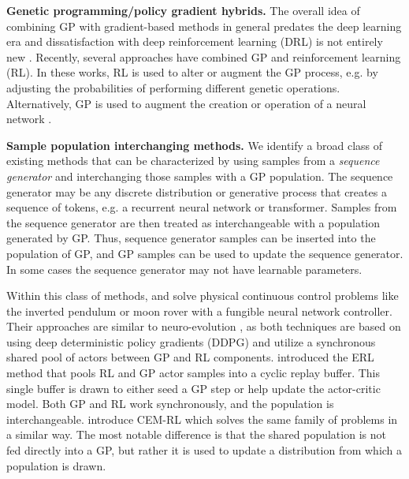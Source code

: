 \documentclass{article}
\begin{document}
\textbf{Genetic programming/policy gradient hybrids.}
The overall idea of combining GP with gradient-based methods in general predates the deep learning era \citep{igel1999using,topchy2001gpgd,zhang2004gpgb, montastruc2004gpgb, wierstra2008gpgb} and dissatisfaction with deep reinforcement learning (DRL) is not entirely new \citep{kurenkov2018reinforcementflaw}.
Recently, several approaches have combined GP and reinforcement learning (RL).
In these works, RL is used to alter or augment the GP process, e.g. by adjusting the probabilities of performing different genetic operations.
Alternatively, GP is used to augment the creation or operation of a neural network \citep{petronski2018gprl,chang2018gprl,gangwani2018gprl,chen2019gprl, stanley2019gprl,real2019gprl,miikkulainen2019gprl,sehgal2019gprl,tian2020gprl,chen2020gprl_a,chen2020gprl_b}.

\textbf{Sample population interchanging methods.}
We identify a broad class of existing methods that can be characterized by using samples from a \emph{sequence generator} and interchanging those samples with a GP population.
The sequence generator may be any discrete distribution or generative process that creates a sequence of tokens, e.g. a recurrent neural network or transformer.
Samples from the sequence generator are then treated as interchangeable with a population generated by GP.
Thus, sequence generator samples can be inserted into the population of GP, and GP samples can be used to update the sequence generator.
In some cases the sequence generator may not have learnable parameters. 

Within this class of methods, \citet{pourchot2019gprl} and \citet{khadka2018gprl} solve physical continuous control problems like the inverted pendulum or moon rover with a fungible neural network controller.
Their approaches are similar to neuro-evolution \citep{stanley2002neuroev, floreano2008neuroev, luders2017neruoev, risi2017neuroev}, as both techniques are based on using deep deterministic policy gradients (DDPG) \citep{lillicrap2015continuous} and utilize a synchronous shared pool of actors between GP and RL components.
\citet{khadka2018gprl} introduced the ERL method that pools RL and GP actor samples into a cyclic replay buffer.
This single buffer is drawn to either seed a GP step or help update the actor-critic model.
Both GP and RL work synchronously, and the population is interchangeable.
\citet{pourchot2019gprl} introduce CEM-RL which solves the same family of problems in a similar way.
The most notable difference is that the shared population is not fed directly into a GP, but rather it is used to update a distribution from which a population is drawn.
\end{document}
